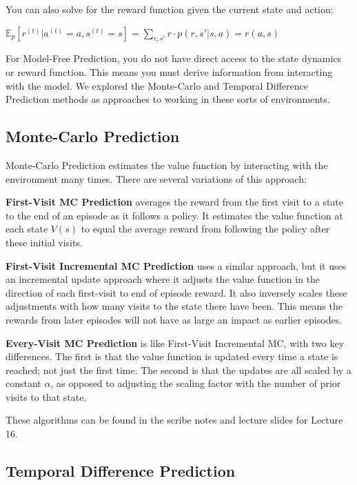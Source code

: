 \documentclass[11pt]{article}
\begin{document}
You can also solve for the reward function given the current state and action:

\begin{center}\begin{large}
    $\mathbb{E}_p[r^{(t)} | a^{(t)}=a, s^{(t)}=s] = \sum\limits_{r, s'} r \cdot p(r,s'|s,a) = r(a,s)$
\end{large}\end{center}

For Model-Free Prediction, you do not have direct access to the state dynamics or reward function. This means you must derive information from interacting with the model. We explored the Monte-Carlo and Temporal Difference Prediction methods as approaches to working in these sorts of environments. 

\subsection{Monte-Carlo Prediction}

Monte-Carlo Prediction estimates the value function by interacting with the environment many times. There are several variations of this approach:

\textbf{First-Visit MC Prediction} averages the reward from the first visit to a state to the end of an episode as it follows a policy. It estimates the value function at each state $V(s)$ to equal the average reward from following the policy after these initial visits. 

\textbf{First-Visit Incremental MC Prediction} uses a similar approach, but it uses an incremental update approach where it adjusts the value function in the direction of each first-visit to end of episode reward. It also inversely scales these adjustments with how many visits to the state there have been. This means the rewards from later episodes will not have as large an impact as earlier episodes.

\textbf{Every-Visit MC Prediction} is like First-Visit Incremental MC, with two key differences. The first is that the value function is updated every time a state is reached; not just the first time. The second is that the updates are all scaled by a constant $\alpha$, as opposed to adjusting the scaling factor with the number of prior visits to that state.

These algorithms can be found in the scribe notes and lecture slides for Lecture 16.


\subsection{Temporal Difference Prediction}
\end{document}
